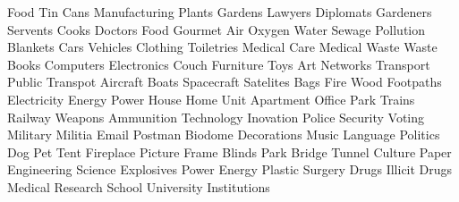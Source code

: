 






Food
Tin Cans
Manufacturing
Plants
Gardens
Lawyers
Diplomats
Gardeners
Servents
Cooks
Doctors
Food
Gourmet
Air
Oxygen
Water
Sewage
Pollution
Blankets
Cars
Vehicles
Clothing
Toiletries
Medical Care
Medical Waste
Waste
Books
Computers
Electronics
Couch
Furniture
Toys
Art
Networks
Transport
Public Transpot
Aircraft
Boats
Spacecraft
Satelites
Bags
Fire
Wood
Footpaths
Electricity
Energy
Power
House
Home
Unit
Apartment
Office
Park
Trains
Railway
Weapons
Ammunition
Technology
Inovation
Police
Security
Voting
Military
Militia
Email
Postman
Biodome
Decorations
Music
Language
Politics
Dog
Pet
Tent
Fireplace
Picture Frame
Blinds
Park
Bridge
Tunnel
Culture
Paper
Engineering
Science
Explosives
Power
Energy
Plastic Surgery
Drugs
Illicit Drugs
Medical Research
School
University
Institutions


